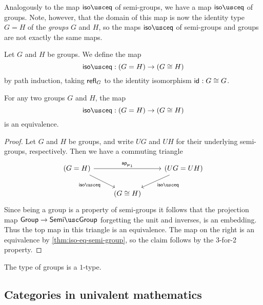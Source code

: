 Analogously to the map $\isoeq$ of semi-groups, we have a map $\isoeq$ of groups. Note, however, that the domain of this map is now the identity type $G=H$ of the \emph{groups} $G$ and $H$, so the maps $\isoeq$ of semi-groups and groups are not exactly the same maps.

\begin{defn}
  Let $G$ and $H$ be groups. We define the map
  \begin{equation*}
    \isoeq : (G=H)\to (G\cong H)
  \end{equation*}
  by path induction, taking $\mathsf{refl}_{G}$ to the identity isomorphism $\mathsf{id}_{}:G\cong G$.
\end{defn}

\begin{thm}
  For any two groups $G$ and $H$, the map
  \begin{equation*}
    \isoeq:(G=H)\to (G\cong H)
  \end{equation*}
  is an equivalence.
\end{thm}

\begin{proof}
  Let $G$ and $H$ be groups, and write $UG$ and $UH$ for their underlying semi-groups, respectively. Then we have a commuting triangle
  \begin{equation*}
    \begin{tikzcd}
      (G=H) \arrow[rr,"\apfunc{\proj 1}"] \arrow[dr,swap,"\isoeq"] & & (UG=UH) \arrow[dl,"\isoeq"] \\
      & (G\cong H)
    \end{tikzcd}
  \end{equation*}
  Since being a group is a property of semi-groups it follows that the projection map $\group\to\semigroup$ forgetting the unit and inverses, is an embedding. Thus the top map in this triangle is an equivalence. The map on the right is an equivalence by \cref{thm:iso-eq-semi-group}, so the claim follows by the 3-for-2 property.
\end{proof}

\begin{cor}
  The type of groups is a $1$-type.
\end{cor}

\subsection{Categories in univalent mathematics}

